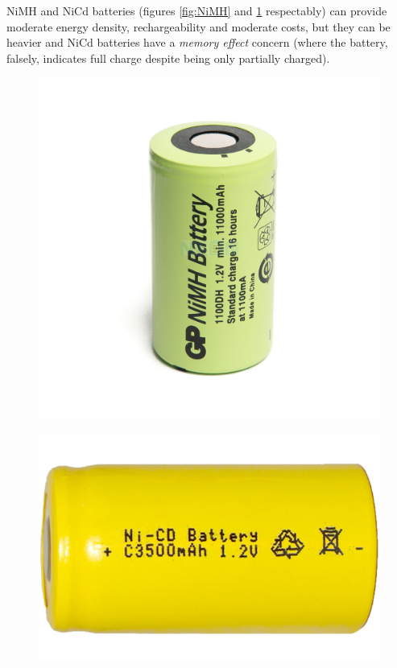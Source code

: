 \gls{NiMH} and \gls{NiCd} batteries (figures \ref{fig:NiMH} and \ref{fig:NiCd} respectably) can provide moderate energy density, rechargeability and moderate costs, but they can be heavier and \gls{NiCd} batteries have a \textit{memory effect} concern (where the battery, falsely, indicates full charge despite being only partially charged).
\begin{figure}[H]
    \centering
    \begin{minipage}{.5\textwidth}
        \centering
        \includegraphics[width=.5\linewidth]{ch3/assets/nimh.jpg}
        \label{fig:NiMH}
    \end{minipage}%
    \begin{minipage}{.5\textwidth}
        \centering
        \includegraphics[width=.5\linewidth]{ch3/assets/nicd.jpg}
        \label{fig:NiCd}
    \end{minipage}
\end{figure}


